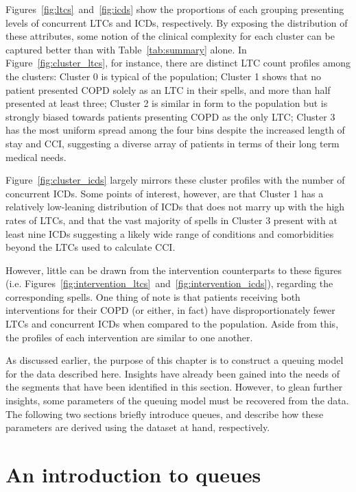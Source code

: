 Figures~\ref{fig:ltcs}~and~\ref{fig:icds} show the proportions of each grouping
presenting levels of concurrent LTCs and ICDs, respectively. By exposing the
distribution of these attributes, some notion of the clinical complexity for
each cluster can be captured better than with Table~\ref{tab:summary} alone. In
Figure~\ref{fig:cluster_ltcs}, for instance, there are distinct LTC count
profiles among the clusters: Cluster 0 is typical of the population; Cluster 1
shows that no patient presented COPD solely as an LTC in their spells, and more
than half presented at least three; Cluster 2 is similar in form to the
population but is strongly biased towards patients presenting COPD as the only
LTC; Cluster 3 has the most uniform spread among the four bins despite the
increased length of stay and CCI, suggesting a diverse array of patients in
terms of their long term medical needs.

Figure~\ref{fig:cluster_icds} largely mirrors these cluster profiles with the
number of concurrent ICDs. Some points of interest, however, are that Cluster 1
has a relatively low-leaning distribution of ICDs that does not marry up with
the high rates of LTCs, and that the vast majority of spells in Cluster 3
present with at least nine ICDs suggesting a likely wide range of conditions and
comorbidities beyond the LTCs used to calculate CCI.\

However, little can be drawn from the intervention counterparts to these figures
(i.e. Figures~\ref{fig:intervention_ltcs}~and~\ref{fig:intervention_icds}),
regarding the corresponding spells. One thing of note is that patients receiving
both interventions for their COPD (or either, in fact) have disproportionately
fewer LTCs and concurrent ICDs when compared to the population. Aside from this,
the profiles of each intervention are similar to one another.

As discussed earlier, the purpose of this chapter is to construct a queuing
model for the data described here. Insights have already been gained into the
needs of the segments that have been identified in this section. However, to
glean further insights, some parameters of the queuing model must be recovered
from the data. The following two sections briefly introduce queues, and describe
how these parameters are derived using the dataset at hand, respectively.


\section{An introduction to queues}\label{sec:queuing}

